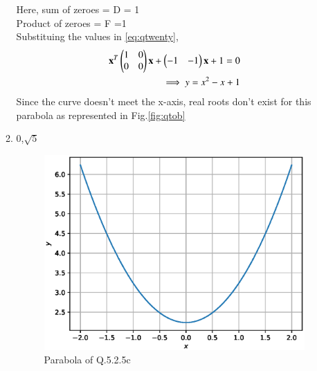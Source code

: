 \begin{enumerate}[label=\thesection.\arabic*.,ref=\thesection.\theenumi]
\begin{enumerate}
		\solution
Here, sum of zeroes = D = 1\\
Product of zeroes = F =1\\
Substituing the values in \ref{eq:qtwenty},\\
\begin{align}
\mathbf{x}^T\begin{pmatrix}1&0\\0&0\end{pmatrix}\mathbf{x}  + \begin{pmatrix}-1&-1\end{pmatrix}\mathbf{x} +1 = 0\\
\implies y = x^2 - x + 1 
\end{align}
Since the curve doesn't meet the x-axis, real roots don't exist for this parabola as represented in Fig.\ref{fig:qtob}	
		\item 0,$\sqrt{5}$
			\begin{figure}[!ht]
	\centering
	\includegraphics[width=\columnwidth]{./figs/conics/q20c.eps}
	\caption{Parabola of Q.5.2.5c}
	\label{fig:qtoc}	
	\end{figure}


\end{enumerate}
\end{enumerate}

